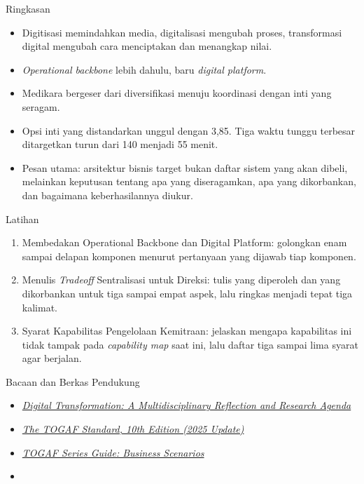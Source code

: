 \documentclass[aspectratio=169, table, 12pt]{beamer}
\begin{document}
\begin{frame}{{\Large Ringkasan}}
  \vspace{6pt}
  \small
  \begin{itemize}
    \item Digitisasi memindahkan media, digitalisasi mengubah proses, transformasi digital mengubah cara
          menciptakan dan menangkap nilai.
    \item \textit{Operational backbone} lebih dahulu, baru \textit{digital platform}.
    \item Medikara bergeser dari diversifikasi menuju koordinasi dengan inti yang seragam.
    \item Opsi inti yang distandarkan unggul dengan 3,85. Tiga waktu tunggu terbesar ditargetkan turun
          dari 140 menjadi 55 menit.
    \item Pesan utama: arsitektur bisnis target bukan daftar sistem yang akan dibeli, melainkan keputusan
          tentang apa yang diseragamkan, apa yang dikorbankan, dan bagaimana keberhasilannya diukur.
  \end{itemize}
\end{frame}

\begin{frame}{{\Large Latihan}}
  \vspace{6pt}
  \small
  \begin{enumerate}
    \item Membedakan Operational Backbone dan Digital Platform: golongkan enam sampai delapan komponen
          menurut pertanyaan yang dijawab tiap komponen.
    \item Menulis \textit{Tradeoff} Sentralisasi untuk Direksi: tulis yang diperoleh dan yang dikorbankan
          untuk tiga sampai empat aspek, lalu ringkas menjadi tepat tiga kalimat.
    \item Syarat Kapabilitas Pengelolaan Kemitraan: jelaskan mengapa kapabilitas ini tidak tampak pada
          \textit{capability map} saat ini, lalu daftar tiga sampai lima syarat agar berjalan.
  \end{enumerate}
\end{frame}

\begin{frame}{{\Large Bacaan dan Berkas Pendukung}}
  \vspace{10pt}
  \begin{itemize}
    \item \href{https://doi.org/10.1016/j.jbusres.2019.09.022}{\textit{Digital Transformation: A Multidisciplinary Reflection and Research Agenda}}
    \item \href{https://www.opengroup.org/togaf}{\textit{The TOGAF Standard, 10th Edition (2025 Update)}}
    \item \href{https://publications.opengroup.org/g176}{\textit{TOGAF Series Guide: Business Scenarios}}
    \item {}
  \end{itemize}
\end{frame}
\end{document}
